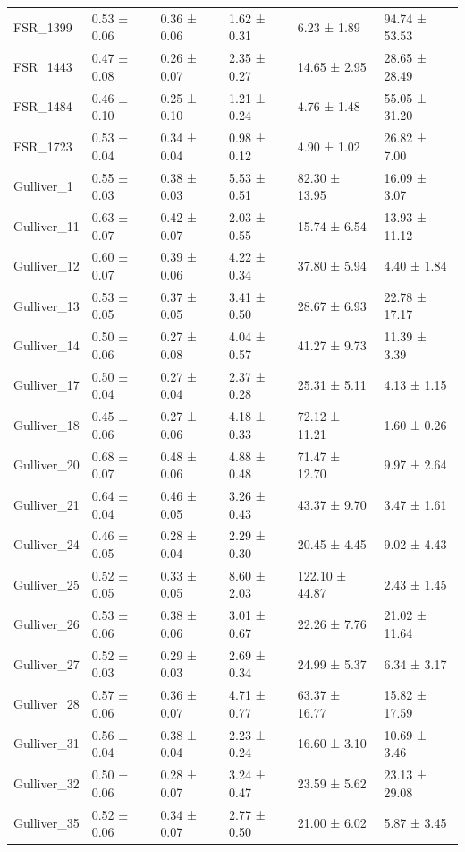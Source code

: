 \begin{tabular}{llllll}
FSR_1399 & 0.53 ± 0.06 & 0.36 ± 0.06 & 1.62 ± 0.31 & 6.23 ± 1.89 & 94.74 ± 53.53 \\
FSR_1443 & 0.47 ± 0.08 & 0.26 ± 0.07 & 2.35 ± 0.27 & 14.65 ± 2.95 & 28.65 ± 28.49 \\
FSR_1484 & 0.46 ± 0.10 & 0.25 ± 0.10 & 1.21 ± 0.24 & 4.76 ± 1.48 & 55.05 ± 31.20 \\
FSR_1723 & 0.53 ± 0.04 & 0.34 ± 0.04 & 0.98 ± 0.12 & 4.90 ± 1.02 & 26.82 ± 7.00 \\
Gulliver_1 & 0.55 ± 0.03 & 0.38 ± 0.03 & 5.53 ± 0.51 & 82.30 ± 13.95 & 16.09 ± 3.07 \\
Gulliver_11 & 0.63 ± 0.07 & 0.42 ± 0.07 & 2.03 ± 0.55 & 15.74 ± 6.54 & 13.93 ± 11.12 \\
Gulliver_12 & 0.60 ± 0.07 & 0.39 ± 0.06 & 4.22 ± 0.34 & 37.80 ± 5.94 & 4.40 ± 1.84 \\
Gulliver_13 & 0.53 ± 0.05 & 0.37 ± 0.05 & 3.41 ± 0.50 & 28.67 ± 6.93 & 22.78 ± 17.17 \\
Gulliver_14 & 0.50 ± 0.06 & 0.27 ± 0.08 & 4.04 ± 0.57 & 41.27 ± 9.73 & 11.39 ± 3.39 \\
Gulliver_17 & 0.50 ± 0.04 & 0.27 ± 0.04 & 2.37 ± 0.28 & 25.31 ± 5.11 & 4.13 ± 1.15 \\
Gulliver_18 & 0.45 ± 0.06 & 0.27 ± 0.06 & 4.18 ± 0.33 & 72.12 ± 11.21 & 1.60 ± 0.26 \\
Gulliver_20 & 0.68 ± 0.07 & 0.48 ± 0.06 & 4.88 ± 0.48 & 71.47 ± 12.70 & 9.97 ± 2.64 \\
Gulliver_21 & 0.64 ± 0.04 & 0.46 ± 0.05 & 3.26 ± 0.43 & 43.37 ± 9.70 & 3.47 ± 1.61 \\
Gulliver_24 & 0.46 ± 0.05 & 0.28 ± 0.04 & 2.29 ± 0.30 & 20.45 ± 4.45 & 9.02 ± 4.43 \\
Gulliver_25 & 0.52 ± 0.05 & 0.33 ± 0.05 & 8.60 ± 2.03 & 122.10 ± 44.87 & 2.43 ± 1.45 \\
Gulliver_26 & 0.53 ± 0.06 & 0.38 ± 0.06 & 3.01 ± 0.67 & 22.26 ± 7.76 & 21.02 ± 11.64 \\
Gulliver_27 & 0.52 ± 0.03 & 0.29 ± 0.03 & 2.69 ± 0.34 & 24.99 ± 5.37 & 6.34 ± 3.17 \\
Gulliver_28 & 0.57 ± 0.06 & 0.36 ± 0.07 & 4.71 ± 0.77 & 63.37 ± 16.77 & 15.82 ± 17.59 \\
Gulliver_31 & 0.56 ± 0.04 & 0.38 ± 0.04 & 2.23 ± 0.24 & 16.60 ± 3.10 & 10.69 ± 3.46 \\
Gulliver_32 & 0.50 ± 0.06 & 0.28 ± 0.07 & 3.24 ± 0.47 & 23.59 ± 5.62 & 23.13 ± 29.08 \\
Gulliver_35 & 0.52 ± 0.06 & 0.34 ± 0.07 & 2.77 ± 0.50 & 21.00 ± 6.02 & 5.87 ± 3.45 \\

\end{tabular}

